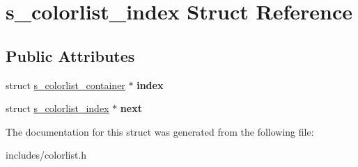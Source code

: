 \hypertarget{structs__colorlist__index}{}\section{s\+\_\+colorlist\+\_\+index Struct Reference}
\label{structs__colorlist__index}
\subsection*{Public Attributes}
\begin{DoxyCompactItemize}
\item 
\mbox{\label{structs__colorlist__index_a345477d879833291eb6decd8d6e52dc4}} 
struct \hyperlink{structs__colorlist__container}{s\+\_\+colorlist\+\_\+container} $\ast$ {\bfseries index}
\item 
\mbox{\label{structs__colorlist__index_a71da7969a15b4416d88cd8c8b14dc124}} 
struct \hyperlink{structs__colorlist__index}{s\+\_\+colorlist\+\_\+index} $\ast$ {\bfseries next}
\end{DoxyCompactItemize}


The documentation for this struct was generated from the following file\+:\begin{DoxyCompactItemize}
\item 
includes/colorlist.\+h\end{DoxyCompactItemize}

